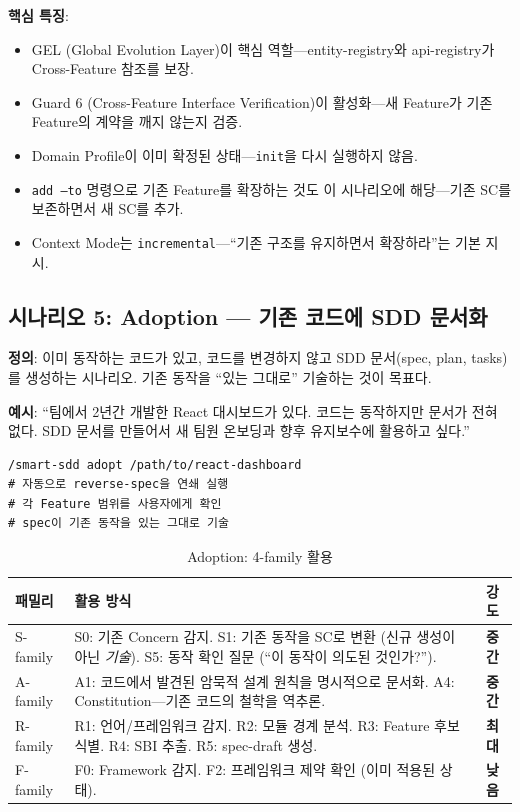 \documentclass[11pt,a4paper,openright,twoside]{report}
\begin{document}
\textbf{핵심 특징}:
\begin{itemize}[nosep]
  \item GEL (Global Evolution Layer)이 핵심 역할---entity-registry와 api-registry가 Cross-Feature 참조를 보장.
  \item Guard 6 (Cross-Feature Interface Verification)이 활성화---새 Feature가 기존 Feature의 계약을 깨지 않는지 검증.
  \item Domain Profile이 이미 확정된 상태---\texttt{init}을 다시 실행하지 않음.
  \item \texttt{add --to} 명령으로 기존 Feature를 확장하는 것도 이 시나리오에 해당---기존 SC를 보존하면서 새 SC를 추가.
  \item Context Mode는 \texttt{incremental}---``기존 구조를 유지하면서 확장하라''는 기본 지시.
\end{itemize}


\subsection{시나리오 5: Adoption --- 기존 코드에 SDD 문서화}
\label{sec:ref-adoption}

\textbf{정의}: 이미 동작하는 코드가 있고, 코드를 변경하지 않고 SDD 문서(spec, plan, tasks)를 생성하는 시나리오. 기존 동작을 ``있는 그대로'' 기술하는 것이 목표다.

\textbf{예시}: ``팀에서 2년간 개발한 React 대시보드가 있다. 코드는 동작하지만 문서가 전혀 없다. SDD 문서를 만들어서 새 팀원 온보딩과 향후 유지보수에 활용하고 싶다.''

\begin{lstlisting}
/smart-sdd adopt /path/to/react-dashboard
# 자동으로 reverse-spec을 연쇄 실행
# 각 Feature 범위를 사용자에게 확인
# spec이 기존 동작을 있는 그대로 기술
\end{lstlisting}

\begin{table}[H]
\centering
\caption{Adoption: 4-family 활용}
\label{tab:ref-adoption}
\begin{tabularx}{\textwidth}{lXl}
\toprule
\textbf{패밀리} & \textbf{활용 방식} & \textbf{강도} \\
\midrule
S-family &
  S0: 기존 Concern 감지. S1: 기존 동작을 SC로 변환 (신규 생성이 아닌 \emph{기술}). S5: 동작 확인 질문 (``이 동작이 의도된 것인가?''). &
  \textbf{중간} \\
\addlinespace
A-family &
  A1: 코드에서 발견된 암묵적 설계 원칙을 명시적으로 문서화. A4: Constitution---기존 코드의 철학을 역추론. &
  \textbf{중간} \\
\addlinespace
R-family &
  R1: 언어/프레임워크 감지. R2: 모듈 경계 분석. R3: Feature 후보 식별. R4: SBI 추출. R5: spec-draft 생성. &
  \textbf{최대} \\
\addlinespace
F-family &
  F0: Framework 감지. F2: 프레임워크 제약 확인 (이미 적용된 상태). &
  \textbf{낮음} \\
\bottomrule
\end{tabularx}
\end{table}
\end{document}
